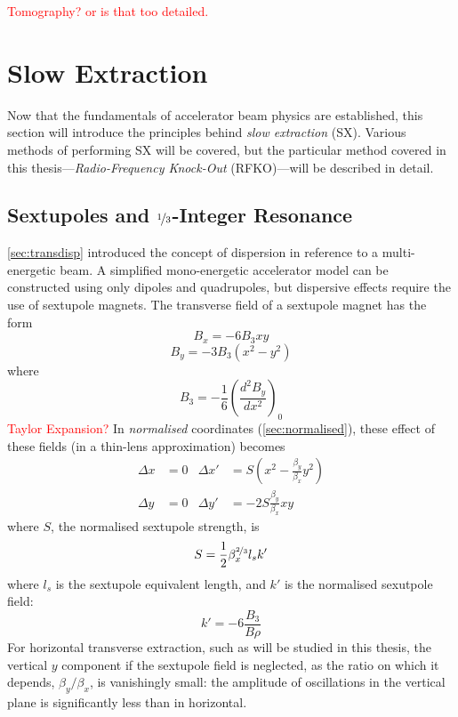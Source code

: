 \documentclass[11pt]{report}
\newcommand\todo[1]{\textcolor{red}{#1}}
\begin{document}
\todo{Tomography? or is that too detailed.}

\section{Slow Extraction}
Now that the fundamentals of accelerator beam physics are established, this section will introduce the principles behind \textit{slow extraction} (SX). Various methods of performing SX will be covered, but the particular method covered in this thesis---\textit{Radio-Frequency Knock-Out} (RFKO)---will be described in detail.

\subsection{Sextupoles and $\nicefrac 13$-Integer Resonance}

\autoref{sec:transdisp} introduced the concept of dispersion in reference to a multi-energetic beam. A simplified mono-energetic accelerator model can be constructed using only dipoles and quadrupoles, but dispersive effects require the use of sextupole magnets. The transverse field of a sextupole magnet has the form
\begin{equation}
  B_x = -6B_3xy
\end{equation}
\begin{equation}
  B_y = -3B_3(x^2-y^2)
\end{equation} where
\begin{equation}
  B_3=-\frac 16\left(\frac{d^2B_y}{dx^2}\right)_0
\end{equation}
\todo{Taylor Expansion?}
In \textit{normalised} coordinates (\autoref{sec:normalised}), these effect of these fields (in a thin-lens approximation) becomes
\begin{align*}
  \Delta x&=0 & \Delta x'&=S(x^2-\frac{\beta_y}{\beta_x}y^2) \\
  \Delta y&=0 & \Delta y'&=-2S\frac{\beta_y}{\beta_x}xy
\end{align*}
where $S$, the normalised sextupole strength, is
\begin{equation}
  S=\frac 12\beta_x^{\nicefrac 23}l_sk'
  \label{eq:normalised_sextupole_strength}
\end{equation} where $l_s$ is the sextupole equivalent length, and $k'$ is the normalised sexutpole field:
\begin{equation}
  k'=-6\frac{B_3}{B\rho}
\end{equation}
For horizontal transverse extraction, such as will be studied in this thesis, the vertical $y$ component if the sextupole field is neglected, as the ratio on which it depends,  $\beta_y/\beta_x$, is vanishingly small: the amplitude of oscillations in the vertical plane is significantly less than in horizontal.
\end{document}
